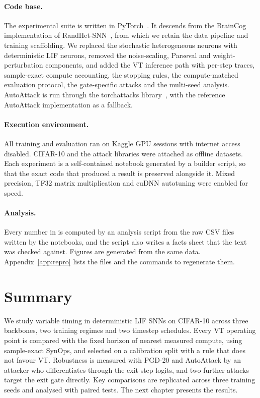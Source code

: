 \paragraph{Code base.} The experimental suite is written in PyTorch~\cite{paszke2019pytorch}. It descends from the BrainCog implementation of RandHet-SNN~\cite{wang2025random}, from which we retain the data pipeline and training scaffolding. We replaced the stochastic heterogeneous neurons with deterministic LIF neurons, removed the noise-scaling, Parseval and weight-perturbation components, and added the VT inference path with per-step traces, sample-exact compute accounting, the stopping rules, the compute-matched evaluation protocol, the gate-specific attacks and the multi-seed analysis. AutoAttack is run through the torchattacks library~\cite{kim2020torchattacks}, with the reference AutoAttack implementation as a fallback.

\paragraph{Execution environment.} All training and evaluation ran on Kaggle GPU sessions with internet access disabled. CIFAR-10 and the attack libraries were attached as offline datasets. Each experiment is a self-contained notebook generated by a builder script, so that the exact code that produced a result is preserved alongside it. Mixed precision, TF32 matrix multiplication and cuDNN autotuning were enabled for speed.

\paragraph{Analysis.} Every number in  is computed by an analysis script from the raw CSV files written by the notebooks, and the script also writes a facts sheet that the text was checked against. Figures are generated from the same data. Appendix~\ref{app:repro} lists the files and the commands to regenerate them.

\section{Summary}

We study variable timing in deterministic LIF SNNs on CIFAR-10 across three backbones, two training regimes and two timestep schedules. Every VT operating point is compared with the fixed horizon of nearest measured compute, using sample-exact SynOps, and selected on a calibration split with a rule that does not favour VT. Robustness is measured with PGD-20 and AutoAttack by an attacker who differentiates through the exit-step logits, and two further attacks target the exit gate directly. Key comparisons are replicated across three training seeds and analysed with paired tests. The next chapter presents the results.
